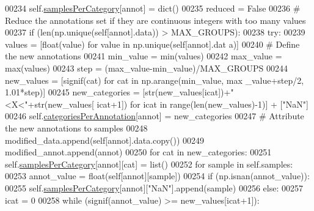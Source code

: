 \begin{DoxyCode}
00234             self.\hyperlink{classnavicom_1_1navidata_1_1NaviAnnotations_a7cbb4ab623948f19e055f5b4b7c938a9}{samplesPerCategory}[annot] = dict()
00235             reduced = \textcolor{keyword}{False}
00236             \textcolor{comment}{# Reduce the annotations set if they are continuous integers with too
       many values}
00237             \textcolor{keywordflow}{if} (len(np.unique(self[annot].data)) > MAX\_GROUPS):
00238                 \textcolor{keywordflow}{try}:
00239                     values = [float(value) \textcolor{keywordflow}{for} value \textcolor{keywordflow}{in} np.unique(self[annot].dat
      a)]
00240                     \textcolor{comment}{# Define the new annotations}
00241                     min\_value = min(values)
00242                     max\_value = max(values)
00243                     step = (max\_value-min\_value)/MAX\_GROUPS
00244                     new\_values = [signif(cat) \textcolor{keywordflow}{for} cat \textcolor{keywordflow}{in} np.arange(min\_value, max
      \_value+step/2, 1.01*step)]
00245                     new\_categories = [str(new\_values[icat])+\textcolor{stringliteral}{"<X<"}+str(new\_values[
      icat+1]) \textcolor{keywordflow}{for} icat \textcolor{keywordflow}{in} range(len(new\_values)-1)] + [\textcolor{stringliteral}{"NaN"}]
00246                     self.\hyperlink{classnavicom_1_1navidata_1_1NaviAnnotations_a1c26e115cb2eabe4384cd2fa0c7f776f}{categoriesPerAnnotation}[annot] = new\_categories
00247                     \textcolor{comment}{# Attribute the new annotations to samples}
00248                     modified\_data.append(self[annot].data.copy())
00249                     modified\_annot.append(annot)
00250                     \textcolor{keywordflow}{for} cat \textcolor{keywordflow}{in} new\_categories:
00251                         self.\hyperlink{classnavicom_1_1navidata_1_1NaviAnnotations_a7cbb4ab623948f19e055f5b4b7c938a9}{samplesPerCategory}[annot][cat] = list()
00252                     \textcolor{keywordflow}{for} sample \textcolor{keywordflow}{in} self.samples:
00253                         annot\_value = float(self[annot][sample])
00254                         \textcolor{keywordflow}{if} (np.isnan(annot\_value)):
00255                             self.\hyperlink{classnavicom_1_1navidata_1_1NaviAnnotations_a7cbb4ab623948f19e055f5b4b7c938a9}{samplesPerCategory}[annot][\textcolor{stringliteral}{"NaN"}].append(sample)
00256                         \textcolor{keywordflow}{else}:
00257                             icat = 0
00258                             \textcolor{keywordflow}{while} (signif(annot\_value) >= new\_values[icat+1]):

\end{DoxyCode}
